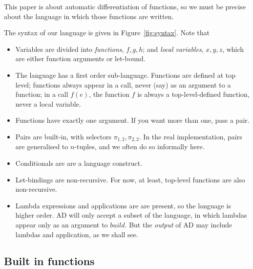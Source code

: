 \documentclass[sigplan,review]{acmart}
\newcommand{\gradf}[1]{\nabla\! #1}  %
\newcommand{\sel}[2]{\pi_{#1,#2}}
\newcommand{\buildfun}{\mathit{build}}
\newcommand{\simon}[1]{}
\newcommand{\awf}[1]{}
\begin{document}
This paper is about automatic differentiation of functions, so we must be precise about
the language in which those functions are written.

The syntax of our language is given in Figure~\ref{fig:syntax}.
Note that
\begin{itemize}
\item  Variables are divided into \emph{functions}, $f,g,h$; and \emph{local variables}, $x,y,z$,
  which are either function arguments or let-bound.
\item 
  The language has a first order sub-language.  Functions are defined at top level;
  functions always appear in a call, never (say) as an argument to a
  function; in a call $f(e)$, the function $f$ is always a
  top-level-defined function, never a local variable.  \awf{at some point we should say where this restriction is needed}

\item Functions have exactly one argument. If you want more than one, pass a pair.

\item Pairs are built-in, with selectors $\sel{1}{2}, \sel{2}{2}$.
  In the real implementation, pairs are generalised to $n$-tuples, and we often do so informally here.

\item Conditionals are are a language construct. \simon{Treating ``if'' as a function
  just didn't work; in particular $\gradf{if}$ needed a linear-map version of
  ``if'' and once we have that we might as well build ``if'' in.  Anyway,
  conditionals are very fundamental, so it's unsurprising.}

\item Let-bindings are non-recursive. For now, at least, top-level
  functions are also non-recursive.  \simon{I think that top-level
    recursive functions might be OK, but I don't want to think about
    that yet.}

\item Lambda expressions and applications are are present, so the language
  is higher order.  AD will only accept a subset of the language, in
  which lambdas appear only as an argument to $\buildfun$.  But the
  \emph{output} of AD may include lambdas and application, as we shall see.
  \end{itemize}

\subsection{Built in functions}
\end{document}
